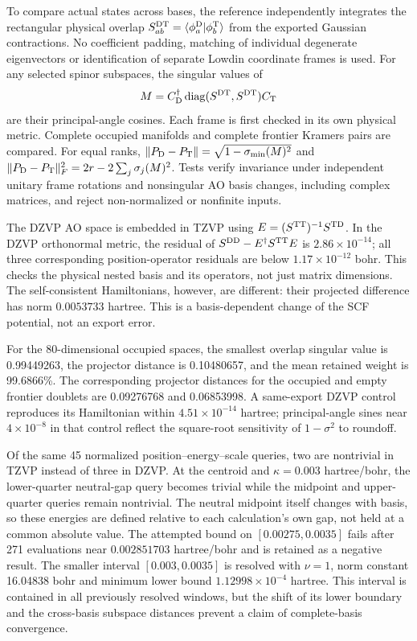 \documentclass[11pt]{article}
\begin{document}
To compare actual states across bases, the reference independently
integrates the rectangular physical overlap
$S_{ab}^{\rm DT}=\langle\phi_a^{\rm D}|\phi_b^{\rm T}\rangle$
from the exported Gaussian contractions. No coefficient padding,
matching of individual degenerate eigenvectors or identification
of separate Lowdin coordinate frames is used. For any selected
spinor subspaces, the singular values of
\begin{equation}
 M=C_{\rm D}^{\dagger}\operatorname{diag}(S^{\rm DT},S^{\rm DT})C_{\rm T}
\end{equation}
are their principal-angle cosines. Each frame is first checked in
its own physical metric. Complete occupied manifolds and complete
frontier Kramers pairs are compared. For equal ranks,
$\|P_{\rm D}-P_{\rm T}\|=\sqrt{1-\sigma_{\min}(M)^2}$ and
$\|P_{\rm D}-P_{\rm T}\|_F^2=2r-2\sum_j\sigma_j(M)^2$.
Tests verify invariance under independent unitary frame rotations
and nonsingular AO basis changes, including complex matrices,
and reject non-normalized or nonfinite inputs.

The DZVP AO space is embedded in TZVP using
$E=(S^{\rm TT})^{-1}S^{\rm TD}$. In the DZVP orthonormal metric,
the residual of $S^{\rm DD}-E^\dagger S^{\rm TT}E$ is
$2.86\times10^{-14}$; all three corresponding position-operator
residuals are below $1.17\times10^{-12}$ bohr. This checks the
physical nested basis and its operators, not just matrix dimensions.
The self-consistent Hamiltonians, however, are different: their
projected difference has norm $0.0053733$ hartree. This is a
basis-dependent change of the SCF potential, not an export error.

For the 80-dimensional occupied spaces, the smallest overlap
singular value is 0.99449263, the projector distance is 0.10480657,
and the mean retained weight is 99.6866\%. The corresponding
projector distances for the occupied and empty frontier doublets
are 0.09276768 and 0.06853998. A same-export DZVP control
reproduces its Hamiltonian within $4.51\times10^{-14}$ hartree;
principal-angle sines near $4\times10^{-8}$ in that control
reflect the square-root sensitivity of $1-\sigma^2$ to roundoff.

Of the same 45 normalized position--energy--scale queries, two
are nontrivial in TZVP instead of three in DZVP. At the centroid
and $\kappa=0.003$ hartree/bohr, the lower-quarter neutral-gap
query becomes trivial while the midpoint and upper-quarter
queries remain nontrivial. The neutral midpoint itself changes
with basis, so these energies are defined relative to each
calculation's own gap, not held at a common absolute value.
The attempted bound on $[0.00275,0.0035]$ fails after 271
evaluations near $0.002851703$ hartree/bohr and is retained as a
negative result. The smaller interval $[0.003,0.0035]$ is
resolved with $\nu=1$, norm constant 16.04838 bohr and minimum
lower bound $1.12998\times10^{-4}$ hartree. This interval is
contained in all previously resolved windows, but the shift of
its lower boundary and the cross-basis subspace distances prevent
a claim of complete-basis convergence.
\end{document}
